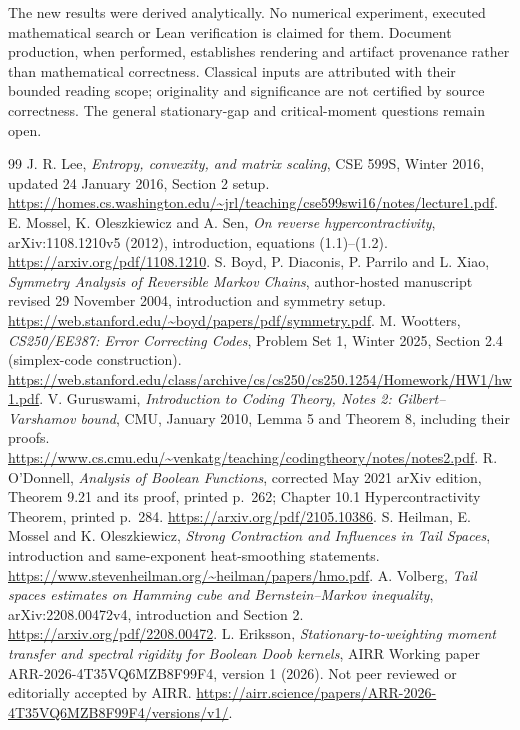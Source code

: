 \documentclass[11pt]{article}
\begin{document}
The new results were derived analytically. No numerical experiment, executed mathematical search or Lean verification is claimed for them. Document production, when performed, establishes rendering and artifact provenance rather than mathematical correctness. Classical inputs are attributed with their bounded reading scope; originality and significance are not certified by source correctness. The general stationary-gap and critical-moment questions remain open.
\begin{thebibliography}{99}
 J. R. Lee, \emph{Entropy, convexity, and matrix scaling}, CSE 599S, Winter 2016, updated 24 January 2016, Section 2 setup. \url{https://homes.cs.washington.edu/~jrl/teaching/cse599swi16/notes/lecture1.pdf}.
 E. Mossel, K. Oleszkiewicz and A. Sen, \emph{On reverse hypercontractivity}, arXiv:1108.1210v5 (2012), introduction, equations (1.1)--(1.2). \url{https://arxiv.org/pdf/1108.1210}.
 S. Boyd, P. Diaconis, P. Parrilo and L. Xiao, \emph{Symmetry Analysis of Reversible Markov Chains}, author-hosted manuscript revised 29 November 2004, introduction and symmetry setup. \url{https://web.stanford.edu/~boyd/papers/pdf/symmetry.pdf}.
 M. Wootters, \emph{CS250/EE387: Error Correcting Codes}, Problem Set 1, Winter 2025, Section 2.4 (simplex-code construction). \url{https://web.stanford.edu/class/archive/cs/cs250/cs250.1254/Homework/HW1/hw1.pdf}.
 V. Guruswami, \emph{Introduction to Coding Theory, Notes 2: Gilbert--Varshamov bound}, CMU, January 2010, Lemma 5 and Theorem 8, including their proofs. \url{https://www.cs.cmu.edu/~venkatg/teaching/codingtheory/notes/notes2.pdf}.
 R. O'Donnell, \emph{Analysis of Boolean Functions}, corrected May 2021 arXiv edition, Theorem 9.21 and its proof, printed p.~262; Chapter 10.1 Hypercontractivity Theorem, printed p.~284. \url{https://arxiv.org/pdf/2105.10386}.
 S. Heilman, E. Mossel and K. Oleszkiewicz, \emph{Strong Contraction and Influences in Tail Spaces}, introduction and same-exponent heat-smoothing statements. \url{https://www.stevenheilman.org/~heilman/papers/hmo.pdf}.
 A. Volberg, \emph{Tail spaces estimates on Hamming cube and Bernstein--Markov inequality}, arXiv:2208.00472v4, introduction and Section 2. \url{https://arxiv.org/pdf/2208.00472}.
 L. Eriksson, \emph{Stationary-to-weighting moment transfer and spectral rigidity for Boolean Doob kernels}, AIRR Working paper ARR-2026-4T35VQ6MZB8F99F4, version 1 (2026). Not peer reviewed or editorially accepted by AIRR. \url{https://airr.science/papers/ARR-2026-4T35VQ6MZB8F99F4/versions/v1/}.

\end{thebibliography}
\end{document}
